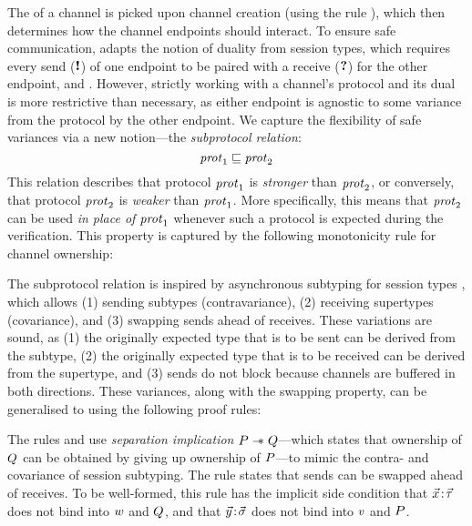 The \pnameSingular of a channel is picked upon channel creation (using the rule
), which then determines how the channel endpoints should interact.
To ensure safe communication, \lname adapts the notion of duality from session
types, which requires every send ($\textnormal{\bf !}$) of one endpoint to be paired with a receive
($\textnormal{\bf ?}$) for the other endpoint, and \viceversa.
However, strictly working with a channel's protocol and its dual is more restrictive than
necessary, as either endpoint is agnostic to some variance from the protocol
by the other endpoint.
We capture the flexibility of safe variances via a new notion---the
\textit{subprotocol relation}:
\[
  \mathit{prot}_1 \sqsubseteq \mathit{prot}_2
\]
This relation describes that protocol $\mathit{prot}_1$ is \textit{stronger} than $\mathit{prot}_2$,
or conversely, that protocol $\mathit{prot}_2$ is \textit{weaker} than $\mathit{prot}_1$.
More specifically, this means that $\mathit{prot}_2$ can be used \textit{in place of}
$\mathit{prot}_1$ whenever such a protocol is expected during the verification.
This property is captured by the following monotonicity rule for channel
ownership:
The subprotocol relation is inspired by asynchronous subtyping for session types
\cite{mostrous-ESOP2009,mostrous-InfComput2015}, which allows (1) sending subtypes (contravariance),
(2) receiving supertypes (covariance), and (3) swapping sends ahead of receives.
These variations are sound, as (1) the originally expected type that is to be sent can be derived
from the subtype, (2) the originally expected type that is to be received can be derived
from the supertype, and (3) sends do not block because channels are buffered in both directions.
These variances, along with the swapping property,
can be generalised to \pname using the following proof rules:
%
The rules  and 
use \emph{separation implication} $P \mathrel{-\!\!\ast} Q$---which states that
ownership of $Q$ can be obtained by giving up ownership
of $P$---to mimic the contra- and covariance of session subtyping.
The rule  states that sends can be swapped ahead of receives.
To be well-formed, this rule has the implicit side condition that $\vec{x}\!:\!\vec{\tau}$ does not
bind into $w$ and $Q$, and that $\vec{y}\!:\!\vec{\sigma}$ does not bind into $v$
and $P$.

